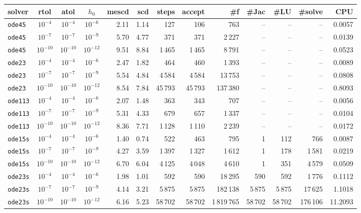 \begin{tabular}{lcccrrrrrrrrr}
\toprule
solver & rtol & atol & $h_0$ & mescd & scd & steps & accept & \#f & \#Jac & \#LU & \#solve & CPU \\
\midrule
\texttt{ode45} & $10^{-4}$ & $10^{-4}$ & $10^{-6}$ & 2.11 & 1.14 & 127 & 106 & 763 & -- & -- & -- & 0.0057 \\
\texttt{ode45} & $10^{-7}$ & $10^{-7}$ & $10^{-9}$ & 5.70 & 4.77 & 371 & 371 & 2\,227 & -- & -- & -- & 0.0139 \\
\texttt{ode45} & $10^{-10}$ & $10^{-10}$ & $10^{-12}$ & 9.51 & 8.84 & 1\,465 & 1\,465 & 8\,791 & -- & -- & -- & 0.0523 \\
\addlinespace
\texttt{ode23} & $10^{-4}$ & $10^{-4}$ & $10^{-6}$ & 2.47 & 1.82 & 464 & 460 & 1\,393 & -- & -- & -- & 0.0089 \\
\texttt{ode23} & $10^{-7}$ & $10^{-7}$ & $10^{-9}$ & 5.54 & 4.84 & 4\,584 & 4\,584 & 13\,753 & -- & -- & -- & 0.0808 \\
\texttt{ode23} & $10^{-10}$ & $10^{-10}$ & $10^{-12}$ & 8.54 & 7.84 & 45\,793 & 45\,793 & 137\,380 & -- & -- & -- & 0.8093 \\
\addlinespace
\texttt{ode113} & $10^{-4}$ & $10^{-4}$ & $10^{-6}$ & 2.07 & 1.48 & 363 & 343 & 707 & -- & -- & -- & 0.0056 \\
\texttt{ode113} & $10^{-7}$ & $10^{-7}$ & $10^{-9}$ & 5.31 & 4.33 & 679 & 657 & 1\,337 & -- & -- & -- & 0.0104 \\
\texttt{ode113} & $10^{-10}$ & $10^{-10}$ & $10^{-12}$ & 8.36 & 7.71 & 1\,128 & 1\,110 & 2\,239 & -- & -- & -- & 0.0172 \\
\addlinespace
\texttt{ode15s} & $10^{-4}$ & $10^{-4}$ & $10^{-6}$ & 1.40 & 0.74 & 522 & 463 & 795 & 1 & 112 & 766 & 0.0087 \\
\texttt{ode15s} & $10^{-7}$ & $10^{-7}$ & $10^{-9}$ & 4.27 & 3.59 & 1\,397 & 1\,327 & 1\,612 & 1 & 178 & 1\,581 & 0.0219 \\
\texttt{ode15s} & $10^{-10}$ & $10^{-10}$ & $10^{-12}$ & 6.70 & 6.04 & 4\,125 & 4\,048 & 4\,610 & 1 & 351 & 4\,579 & 0.0509 \\
\addlinespace
\texttt{ode23s} & $10^{-4}$ & $10^{-4}$ & $10^{-6}$ & 1.98 & 1.01 & 592 & 590 & 18\,295 & 590 & 592 & 1\,776 & 0.1112 \\
\texttt{ode23s} & $10^{-7}$ & $10^{-7}$ & $10^{-9}$ & 4.14 & 3.21 & 5\,875 & 5\,875 & 182\,138 & 5\,875 & 5\,875 & 17\,625 & 1.1018 \\
\texttt{ode23s} & $10^{-10}$ & $10^{-10}$ & $10^{-12}$ & 6.16 & 5.23 & 58\,702 & 58\,702 & 1\,819\,765 & 58\,702 & 58\,702 & 176\,106 & 11.2093 \\

\end{tabular}
